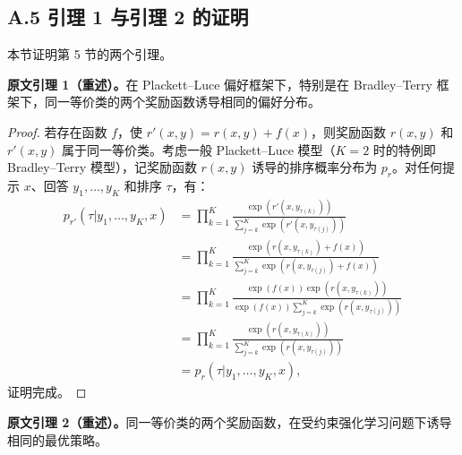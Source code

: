 \subsection*{A.5 引理 1 与引理 2 的证明}

本节证明第 5 节的两个引理。


\textbf{原文引理 1（重述）。}在 Plackett--Luce 偏好框架下，特别是在 Bradley--Terry 框架下，同一等价类的两个奖励函数诱导相同的偏好分布。

\begin{proof}
若存在函数 $f$，使 $r'(x,y)=r(x,y)+f(x)$，则奖励函数 $r(x,y)$ 和 $r'(x,y)$ 属于同一等价类。考虑一般 Plackett--Luce 模型（$K=2$ 时的特例即 Bradley--Terry 模型），记奖励函数 $r(x,y)$ 诱导的排序概率分布为 $p_r$。对任何提示 $x$、回答 $y_1,\ldots,y_K$ 和排序 $\tau$，有：
\label{dpo-display-27}
\begin{align*}
    p_{r'}(\tau| y_1,\ldots, y_K, x) &= 
     \prod_{k=1}^{K}\frac{\exp(r'(x, y_{\tau(k)}))}{\sum_{j=k}^{K}\exp(r'(x, y_{\tau(j)}))} \\
     &= \prod_{k=1}^{K}\frac{\exp(r(x, y_{\tau(k)}) + f(x))}{\sum_{j=k}^{K}\exp(r(x, y_{\tau(j)})+f(x))} \\
     &= \prod_{k=1}^{K}\frac{\exp(f(x))\exp(r(x, y_{\tau(k)}))}{\exp(f(x))\sum_{j=k}^{K}\exp(r(x, y_{\tau(j)}))} \\
     &= \prod_{k=1}^{K}\frac{\exp(r(x, y_{\tau(k)}))}{\sum_{j=k}^{K}\exp(r(x, y_{\tau(j)}))} \\
     &= p_{r}(\tau| y_1,\ldots, y_K, x),
\end{align*}
证明完成。\qedhere
\end{proof}




\textbf{原文引理 2（重述）。}同一等价类的两个奖励函数，在受约束强化学习问题下诱导相同的最优策略。

